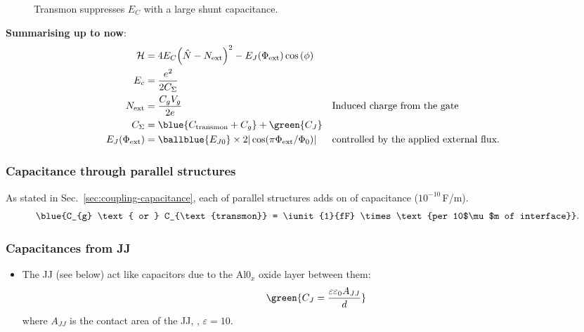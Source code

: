 \begin{figure}[h]
  \centering {}
  \caption{\small Transmon suppresses $E_{C}$ with a large shunt capacitance. \label{fig:cooper_pair_box_4_transmon}}
\end{figure}

\newpage
\begin{framed}\noindent
  \textbf{Summarising up to now}:
  \begin{equation}\label{eq:cooper-pair-box-summary}
    \begin{aligned}
      \mathcal{H} & = 4E_C{\left(\hat{N}-N_\text{ext}\right)^2} -
      E_J(\Phi_{\text{ext}})\cos\left(\phi\right)\\
      E_c& = \frac{e^2}{2C_\Sigma}\\
      N_\text{ext} & = \frac{C_g V_g}{2e} && \text{Induced charge from the gate}\\
      C_{\Sigma} & = \blue{C_\text{transmon} + C_g}+ \green{C_J}\\
      E_J(\Phi_{\text{ext}}) & = \ballblue{E_{J0}} \times 2|\cos(\pi\Phi_\text{ext}/\Phi_0)| && \text{controlled by the applied external flux}.\\
    \end{aligned}
  \end{equation}

  \subsubsection{Capacitance through parallel structures}
  \label{sec:capac-thro-parall}
  As stated in Sec.~\ref{sec:coupling-capacitance}, each  of parallel structures adds on 
  of capacitance ($10^{-10}\,$F/m).
  \begin{equation}
    \blue{C_{g} \text{ or } C_{\text{transmon}} = \iunit{1}{fF} \times \text{per 10$\mu$m of interface}}.
  \end{equation}

\begin{center}
\end{center}

\subsubsection{Capacitances from JJ}
\label{sec:capacitances-from-jj}
\begin{itemize}
\item The JJ (see below) act like capacitors due to the Al0$_x$ oxide layer between them:
  \begin{equation}
    \green{C_J = \frac{\varepsilon\varepsilon_0A_{JJ}}{d}}
  \end{equation}
  \noindent where $A_{JJ}$ is the contact area of the JJ, , $\varepsilon = 10$.


\end{itemize}
\end{framed}
